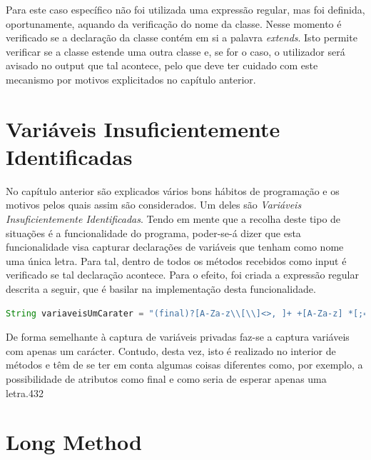 \hspace{5mm} Para este caso específico não foi utilizada uma expressão regular, mas foi definida, oportunamente, aquando da verificação do nome da classe. Nesse momento é verificado se a declaração da classe contém em si a palavra \textit{extends}. Isto permite verificar se a classe estende uma outra classe e, se for o caso, o utilizador será avisado no output que tal acontece, pelo que deve ter cuidado com este mecanismo por motivos explicitados no capítulo anterior.

\section{Variáveis Insuficientemente Identificadas}

\hspace{5mm} No capítulo anterior são explicados vários bons hábitos de programação e os motivos pelos quais assim são considerados. Um deles são \textit{Variáveis Insuficientemente Identificadas}. Tendo em mente que  a recolha deste tipo de situações é a funcionalidade do programa, poder-se-á dizer que esta funcionalidade visa capturar declarações de variáveis que tenham como nome uma única letra. Para tal, dentro de todos os métodos recebidos como input é verificado se tal declaração acontece. Para o efeito, foi criada a expressão regular descrita a seguir, que é basilar na implementação desta funcionalidade.

\vspace{0.5cm}

\begin{lstlisting}[language=Java]  
String variaveisUmCarater = "(final)?[A-Za-z\\[\\]<>, ]+ +[A-Za-z] *[;=]";
\end{lstlisting}

\vspace{0.5cm}

\par De forma semelhante à captura de variáveis privadas faz-se a captura variáveis com apenas um carácter. Contudo, desta vez, isto é realizado no interior de métodos e têm de se ter em conta algumas coisas diferentes como, por exemplo, a possibilidade de atributos como final e como seria de esperar apenas uma letra.432

\section{Long Method}

